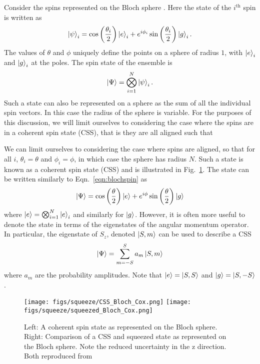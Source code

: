 \documentclass{article}
\begin{document}
Consider the spins represented on the Bloch sphere \cite{Cox2016}. Here the
state of the $i^\text{th}$ spin is written as
%
\begin{equation}
  \ket{\psi}_i = \cos\left(\frac{\theta_i}{2}\right)\ket{e}_i +
  e^{i\phi_i}\sin\left(\frac{\theta_i}{2}\right)\ket{g}_i.
  \label{eqn:blochspin}
\end{equation}
%
The values of $\theta$ and $\phi$ uniquely define the points on a sphere of
radius $1$, with $\ket{e}_i$ and $\ket{g}_i$ at the poles. The spin state of
the ensemble is
%
\begin{equation}
  \ket{\Psi} = \bigotimes_{i=1}^N \ket{\psi}_i.
\end{equation}
Such a state can also be represented on a sphere as the sum of all the
individual spin vectors. In this case the radius of the sphere is variable. For
the purposes of this discussion, we will limit ourselves to considering the
case where the spins are in a coherent spin state (CSS), that is they are all
aligned such that 

We can limit ourselves to considering the case where spins are aligned,
so that for all $i$, $\theta_i = \theta$ and $\phi_i = \phi$, in which case the
sphere has radius $N$. Such a state is known as a coherent spin state (CSS) and
is illustrated in Fig.~\ref{CSSbloch}. The state can be written similarly to
Eqn.~\ref{eqn:blochspin} as
%
\begin{equation}
  \ket{\Psi} = \cos\left(\frac{\theta}{2}\right)\ket{e} +
  e^{i\phi}\sin\left(\frac{\theta}{2}\right)\ket{g}
\end{equation}
%
where $\ket{e} = \bigotimes_{i=1}^N\ket{e}_i$ and similarly for $\ket{g}$.
However, it is often more useful to denote the state in terms of the
eigenstates of the angular momentum operator. In particular, the eigenstate of
$S_z$, denoted $\ket{S, m}$ can be used to describe a CSS
%
\begin{equation}
  \ket{\Psi} = \sum_{m=-S}^S a_m \ket{S, m}
\end{equation}
where $a_m$ are the probability amplitudes. Note that $\ket{e} = \ket{S, S}$
and $\ket{g} = \ket{S, -S}$.

\begin{figure}
  \centering
  \texttt{[image: figs/squeeze/CSS\_Bloch\_Cox.png]}
  \texttt{[image: figs/squeeze/squeezed\_Bloch\_Cox.png]}
  \caption{Left: A coherent spin state as represented on the Bloch sphere.
  Right: Comparison of a CSS and squeezed state as represented on the Bloch
  sphere. Note the reduced uncertainty in the z direction.
  Both reproduced from~\cite{Cox2016}}
  \label{CSSbloch}
\end{figure}
\end{document}
